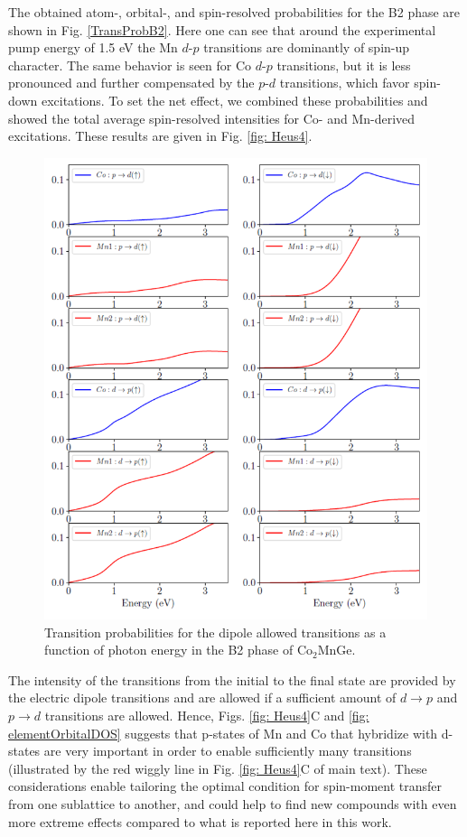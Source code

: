 The obtained atom-, orbital-, and spin-resolved probabilities for the B2 phase are shown in Fig. \ref{TransProbB2}. Here one can see that around the experimental pump energy of 1.5 eV the Mn $d$-$p$ transitions are dominantly of spin-up character. The same behavior is seen for Co $d$-$p$ transitions, but it is less pronounced and further compensated by the $p$-$d$ transitions, which favor spin-down excitations. To set the net effect, we combined these probabilities and showed the total average spin-resolved intensities for Co- and Mn-derived excitations. These results are given in Fig. \ref{fig: Heus4}.
\begin{figure}[htbp]
	\begin{center}
		\includegraphics[width=150mm]{figs/TransitionProbB2}
	\end{center}
	\caption{Transition probabilities for the dipole allowed transitions as a function of photon energy in the B2 phase of Co$_2$MnGe. }
	\label{fig: TransitionProbB2}
\end{figure}
The intensity of the transitions from the initial to the final state are provided by the electric dipole transitions and are allowed if a sufficient amount of $d\rightarrow p$ and $p\rightarrow d$ transitions are allowed. Hence, Figs. \ref{fig: Heus4}C and \ref{fig: elementOrbitalDOS} suggests that p-states of Mn and Co that hybridize with d-states are very important in order to enable sufficiently many transitions (illustrated by the red wiggly line in Fig. \ref{fig: Heus4}C of main text). These considerations enable tailoring the optimal condition for spin-moment transfer from one sublattice to another, and could help to find new compounds with even more extreme effects compared to what is reported here in this work.

